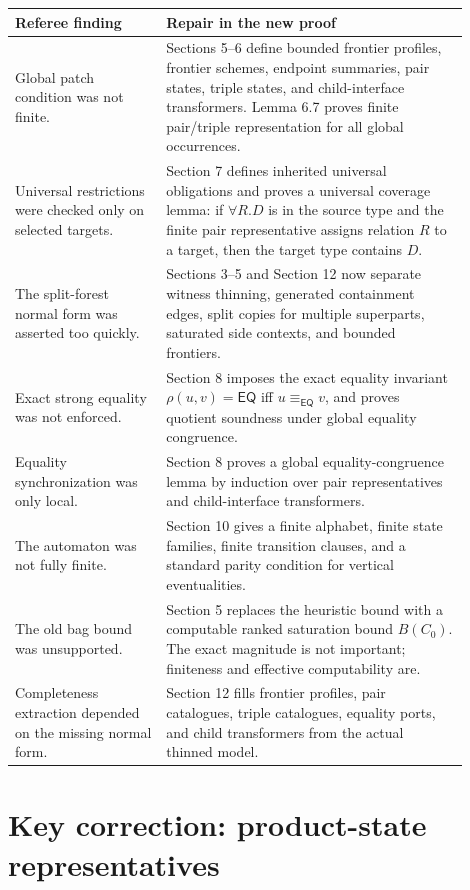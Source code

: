 \documentclass[11pt]{article}
\newcommand{\EQ}{\mathsf{EQ}}
\begin{document}
\begin{longtable}{p{0.30\linewidth}p{0.60\linewidth}}
\toprule
Referee finding & Repair in the new proof \\
\midrule
Global patch condition was not finite. & Sections 5--6 define bounded frontier profiles, frontier schemes, endpoint summaries, pair states, triple states, and child-interface transformers.  Lemma 6.7 proves finite pair/triple representation for all global occurrences. \\
Universal restrictions were checked only on selected targets. & Section 7 defines inherited universal obligations and proves a universal coverage lemma: if $\forall R.D$ is in the source type and the finite pair representative assigns relation $R$ to a target, then the target type contains $D$. \\
The split-forest normal form was asserted too quickly. & Sections 3--5 and Section 12 now separate witness thinning, generated containment edges, split copies for multiple superparts, saturated side contexts, and bounded frontiers. \\
Exact strong equality was not enforced. & Section 8 imposes the exact equality invariant $\rho(u,v)=\EQ$ iff $u\equiv_{\EQ}v$, and proves quotient soundness under global equality congruence. \\
Equality synchronization was only local. & Section 8 proves a global equality-congruence lemma by induction over pair representatives and child-interface transformers. \\
The automaton was not fully finite. & Section 10 gives a finite alphabet, finite state families, finite transition clauses, and a standard parity condition for vertical eventualities. \\
The old bag bound was unsupported. & Section 5 replaces the heuristic bound with a computable ranked saturation bound $B(C_0)$.  The exact magnitude is not important; finiteness and effective computability are. \\
Completeness extraction depended on the missing normal form. & Section 12 fills frontier profiles, pair catalogues, triple catalogues, equality ports, and child transformers from the actual thinned model. \\
\bottomrule
\end{longtable}

\section*{Key correction: product-state representatives}
\end{document}
